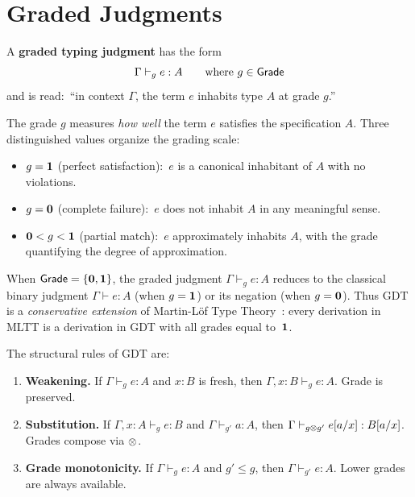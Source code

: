 \section{Graded Judgments}
\label{sec:graded-judgments}

\begin{definition}
\label{def:graded-judgment}
A \textbf{graded typing judgment} has the form
\[
  \Gamma \vdash_g e : A
  \qquad\text{where } g \in \mathsf{Grade}
\]
and is read:\ ``in context $\Gamma$, the term $e$ inhabits type $A$
at grade $g$.''
\end{definition}

The grade $g$ measures \emph{how well} the term $e$ satisfies the
specification $A$.  Three distinguished values organize the grading
scale:

\begin{itemize}[nosep]
\item $g = \mathbf{1}$ (perfect satisfaction):\ $e$ is a canonical
  inhabitant of $A$ with no violations.
\item $g = \mathbf{0}$ (complete failure):\ $e$ does not inhabit $A$
  in any meaningful sense.
\item $\mathbf{0} < g < \mathbf{1}$ (partial match):\ $e$ approximately
  inhabits $A$, with the grade quantifying the degree of
  approximation.
\end{itemize}

\begin{remark}
When $\mathsf{Grade} = \{\mathbf{0}, \mathbf{1}\}$, the graded judgment
$\Gamma \vdash_g e : A$ reduces to the classical binary judgment
$\Gamma \vdash e : A$ (when $g = \mathbf{1}$) or its negation (when
$g = \mathbf{0}$).  Thus GDT is a \emph{conservative extension} of
Martin-L\"of Type Theory~\cite{mlm1984}: every derivation in MLTT
is a derivation in GDT with all grades equal to~$\mathbf{1}$.
\end{remark}

The structural rules of GDT are:

\begin{definition}
\label{def:structural-rules}
\leavevmode
\begin{enumerate}[label=(\alph*)]
\item \textbf{Weakening.} If $\Gamma \vdash_g e : A$ and
  $x : B$ is fresh, then $\Gamma, x : B \vdash_g e : A$.
  Grade is preserved.
\item \textbf{Substitution.} If $\Gamma, x : A \vdash_g e : B$
  and $\Gamma \vdash_{g'} a : A$, then
  $\Gamma \vdash_{g \otimes g'} e[a/x] : B[a/x]$.
  Grades compose via $\otimes$.
\item \textbf{Grade monotonicity.} If $\Gamma \vdash_g e : A$
  and $g' \leq g$, then $\Gamma \vdash_{g'} e : A$.
  Lower grades are always available.
\end{enumerate}
\end{definition}

